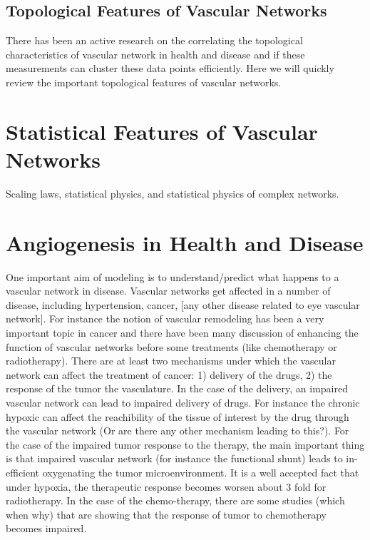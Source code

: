 \documentclass[10pt,a4paper,twocolumn]{article}
\begin{document}
	\subsection{Topological Features of Vascular Networks}
	There has been an active research on the correlating the topological characteristics of vascular network in health and disease and if these measurements can cluster these data points efficiently. Here we will quickly review the important topological features of vascular networks.
	
	
	
	\section{Statistical Features of Vascular Networks}
	Scaling laws, statistical physics, and statistical physics of complex networks. 

	
	
	
	\section{Angiogenesis in Health and Disease}
	One important aim of modeling is to understand/predict what happens to a vascular network in disease. Vascular networks get affected in a number of disease, including hypertension, cancer, [any other disease related to eye vascular network]. For instance the notion of vascular remodeling has been a very important topic in cancer and there have been many discussion of enhancing the function of vascular networks before some treatments (like chemotherapy or radiotherapy). There are at least two mechanisms under which the vascular network can affect the treatment of cancer: 1) delivery of the drugs, 2) the response of the tumor the vasculature. In the case of the delivery, an impaired vascular network can lead to impaired delivery of drugs. For instance the chronic hypoxic can affect the reachibility of the tissue of interest by the drug through the vascular network (Or are there any other mechanism leading to this?). For the case of the impaired tumor response to the therapy, the main important thing is that impaired vascular network (for instance the functional shunt) leads to in-efficient oxygenating the tumor microenvironment. It is a well accepted fact that under hypoxia, the therapeutic response becomes worsen about 3 fold for radiotherapy. In the case of the chemo-therapy, there are some studies (which when why) that are showing that the response of tumor to chemotherapy becomes impaired.
	
\end{document}
